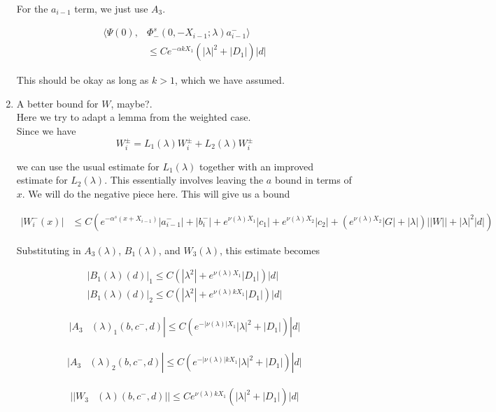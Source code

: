 \documentclass[12pt]{article}
\begin{document}
\begin{enumerate}
For the $a_{i-1}$ term, we just use $A_3$.

\begin{align*}
\langle \Psi(0), &\Phi^s_-(0, -X_{i-1}; \lambda)a_{i-1}^- \rangle \\
&\leq C e^{-\alpha k X_1} ( |\lambda|^2 + |D_1|) |d|
\end{align*}

This should be okay as long as $k > 1$, which we have assumed.\\

\item A better bound for $W$, maybe?.\\

Here we try to adapt a lemma from the weighted case.\\

Since we have 
\[
W_i^\pm = L_1(\lambda)W_i^\pm + L_2(\lambda)W_i^\pm 
\]

we can use the usual estimate for $L_1(\lambda)$ together with an improved estimate for $L_2(\lambda)$. This essentially involves leaving the $a$ bound in terms of $x$. We will do the negative piece here. This will give us a bound 

\begin{align*}
| W_i^-(x)| &\leq C \left( e^{-\alpha^s(x + X_{i-1})} |a^-_{i-1}| + |b_i^-| + e^{\nu(\lambda)X_1}|c_1| + e^{\nu(\lambda)X_2}|c_2| + (e^{\nu(\lambda)X_2} |G| + |\lambda|)||W|| + |\lambda|^2 |d|  \right)
\end{align*}

Substituting in $A_3(\lambda)$, $B_1(\lambda)$, and $W_3(\lambda)$, this estimate becomes

\begin{align}
|B_1(\lambda)(d)|_1 \leq C(|\lambda^2| + e^{\nu(\lambda) X_1}|D_1|)|d| \\
|B_1(\lambda)(d)|_2 \leq C(|\lambda^2| + e^{\nu(\lambda)k X_1}|D_1|)|d|
\end{align}

\begin{align*}
|A_3&(\lambda)_1(b, c^-, d)| \leq C( e^{-|\nu(\lambda)|X_1} |\lambda|^2 + |D_1|) |d| 
\end{align*}

\begin{align*}
|A_3&(\lambda)_2(b, c^-, d)| \leq C( e^{-|\nu(\lambda)| k X_1} |\lambda|^2 + |D_1|) |d|
\end{align*}

\begin{align*}
||W_3&(\lambda)(b,c^-,d)|| \leq C e^{\nu(\lambda)k X_1} ( |\lambda|^2 + |D_1| )|d|
\end{align*}


\end{enumerate}
\end{document}
